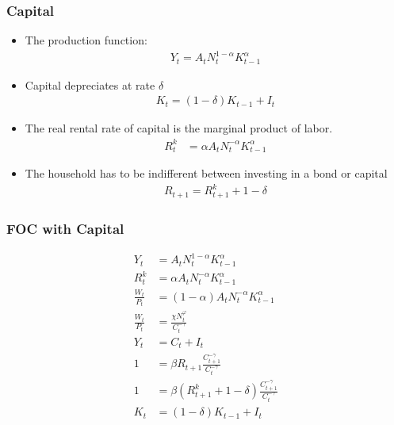 \documentclass[english,xcolor=svgnames]{beamer}
\begin{document}
\begin{frame}
    \frametitle{Capital}
    \begin{itemize}
        \item The production function:
        \begin{align*}
        	Y_t=A_tN_{t}^{1-\alpha}K_{t-1}^{\alpha}
        \end{align*}
        \item Capital depreciates at rate $\delta$
        \begin{align*}
        	K_t = (1-\delta)K_{t-1} + I_t
        \end{align*}
        \item The real rental rate of capital is the marginal product of labor.
        \begin{align*}
        	R_t^k&= \alpha A_tN_{t}^{-\alpha}K_{t-1}^{\alpha} 
        \end{align*}
        \item The household has to be indifferent between investing in a bond or capital
        \begin{align*}
        	R_{t+1} = R_{t+1}^k + 1 - \delta
        \end{align*}
	\end{itemize}
\end{frame}


\begin{frame}
    \frametitle{FOC with Capital}
        \begin{align*}
			Y_t&=A_tN_{t}^{1-\alpha}K_{t-1}^{\alpha}  \\
			R_t^k&= \alpha A_tN_{t}^{-\alpha}K_{t-1}^{\alpha}   \\
			\frac{W_t}{P_t}&= (1-\alpha)A_tN_{t}^{-\alpha}K_{t-1}^{\alpha}  \\
			\frac{W_t}{P_t}&=\frac{\chi N_t^\varphi}{C_t^{-\gamma}} \\
			Y_t&=C_t + I_t \\
			1&=\beta R_{t+1} \frac{C_{t+1}^{-\gamma}}{C_{t}^{-\gamma}} \\
			1&=\beta (R_{t+1}^k + 1 - \delta) \frac{C_{t+1}^{-\gamma}}{C_{t}^{-\gamma}} \\
			K_t &= (1-\delta)K_{t-1} + I_t
		\end{align*}
\end{frame}
\end{document}
